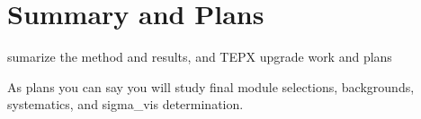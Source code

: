 \newpage \section{Summary and Plans} 
\label{sec:conclusion}
sumarize the method and results, and TEPX upgrade work and plans

As plans you can say you will study final module selections, backgrounds, systematics, and sigma_{vis} determination. 
